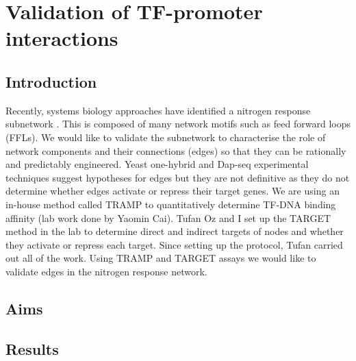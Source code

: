 \documentclass[../main.tex]{subfiles}
\begin{document}
\chapter{Validation of TF-promoter interactions}\label{chapter4}
\section{Introduction}\label{chapter4:introduction}
Recently, systems biology approaches have identified a nitrogen response subnetwork \autocite{gaudinierTranscriptionalRegulationNitrogenassociated2018}.
This is composed of many network motifs such as feed forward loops (FFLs).
We would like to validate the subnetwork to characterise the role of network components and their connections (edges) so that they can be rationally and predictably engineered.
Yeast one-hybrid and Dap-seq experimental techniques suggest hypotheses for edges but they are not definitive as they do not determine whether edges activate or repress their target genes.
We are using an in-house method called TRAMP to quantitatively determine TF-DNA binding affinity (lab work done by Yaomin Cai).
Tufan Oz and I set up the TARGET~\autocite{bargmannTARGETTransientTransformation2013} method in the lab to determine direct and indirect targets of nodes and whether they activate or repress each target. Since setting up the protocol, Tufan carried out all of the work.
Using TRAMP and TARGET assays we would like to validate edges in the nitrogen response network.
\section{Aims}\label{chapter4:aims}
\section{Results}\label{chapter4:results}
\end{document}
